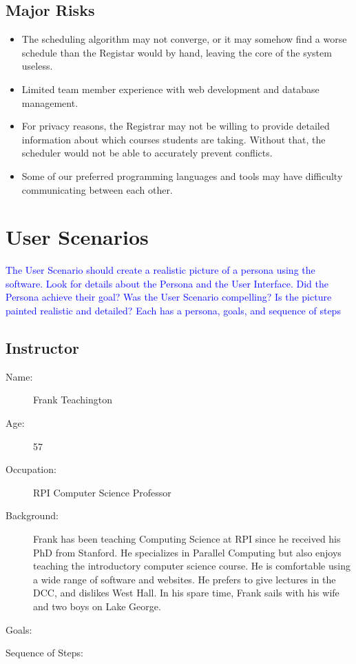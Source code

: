 \documentclass[11pt]{article}
\begin{document}
\subsection{Major Risks} %

\begin{itemize}
\item The scheduling algorithm may not converge, or it may somehow find a worse schedule than the Registar would by hand, leaving the core of the system useless.
\item Limited team member experience with web development and database management.
\item For privacy reasons, the Registrar may not be willing to provide detailed information about which courses students are taking. Without that, the scheduler would not be able to accurately prevent conflicts.
\item Some of our preferred programming languages and tools may have difficulty communicating between each other. %
\end{itemize}


\section{User Scenarios}  %
\textcolor{blue}{The User Scenario should create a realistic picture of a persona using the software.
Look for details about the Persona and the User Interface.
Did the Persona achieve their goal?
Was the User Scenario compelling?
Is the picture painted realistic and detailed?
Each has a persona, goals, and sequence of steps}
\subsection{Instructor} %
\begin{description}
\item[Name:] Frank Teachington
\item[Age:] 57
\item[Occupation:] RPI Computer Science Professor
\item[Background:] Frank has been teaching Computing Science at RPI since he received his PhD from Stanford. He specializes in Parallel Computing but also enjoys teaching the introductory computer science course. He is comfortable using a wide range of software and websites. He prefers to give lectures in the DCC, and dislikes West Hall.  In his spare time, Frank sails with his wife and two boys on Lake George.

\item[Goals:]
\begin{enumerate}
\end{enumerate}

\item[Sequence of Steps:]
\end{description}
\end{document}
